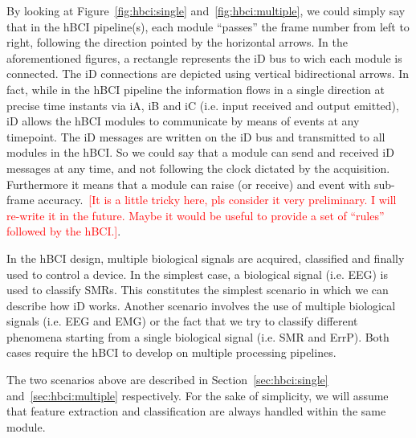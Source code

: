 \documentclass[a4paper,10pt]{article}
\newcommand{\note}[1]{\textcolor{red}{#1}}
\begin{document}
By looking at Figure~\ref{fig:hbci:single} and~\ref{fig:hbci:multiple}, we could
simply say that in the hBCI pipeline(s), each module ``passes'' the frame number
from left to right, following the direction pointed by the horizontal arrows.
In the aforementioned figures, a rectangle represents the iD bus to wich each
module is connected. 
The iD connections are depicted using vertical bidirectional arrows. 
In fact, while in the hBCI pipeline the information flows in a single direction
at precise time instants via iA, iB and iC (i.e. input received and output
emitted), iD allows the hBCI modules to communicate by means of events at any
timepoint.  
The iD messages are written on the iD bus and transmitted to all
modules in the hBCI. So we could say that a module can send and received iD
messages at any time, and not following the clock dictated by the acquisition.
Furthermore it means that a module can raise (or receive) and event with
sub-frame accuracy.~\note{[It is a little tricky here, pls consider it very
preliminary. I will re-write it in the future. Maybe it would be useful to
provide a set of ``rules'' followed by the hBCI.]}.

In the hBCI design, multiple biological signals are acquired, classified
and finally used to control a device.
In the simplest case, a biological signal (i.e. EEG) is used to classify SMRs.
This constitutes the simplest scenario in which we can describe how iD works.
Another scenario involves the use of multiple biological signals (i.e. EEG and
EMG) or the fact that we try to classify different phenomena starting from a 
single biological signal (i.e. SMR and ErrP).
Both cases require the hBCI to develop on multiple processing pipelines.

The two scenarios above are described in Section~\ref{sec:hbci:single} 
and~\ref{sec:hbci:multiple} respectively.
For the sake of simplicity, we will assume that feature extraction and
classification are always handled within the same module.
\end{document}
